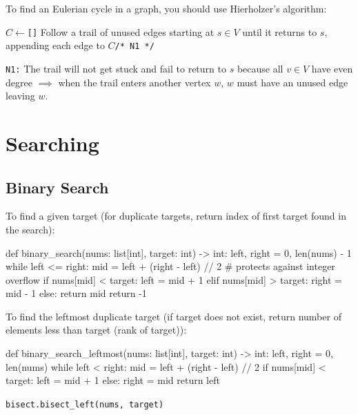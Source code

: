 \documentclass[12pt, titlepage]{article}
\begin{document}
To find an Eulerian cycle in a graph, you should use Hierholzer's algorithm: \medskip

\begin{algorithm}[H]
  \SetAlgoLined
  \DontPrintSemicolon
  $C \longleftarrow$\hspace{0.5mm}\texttt{[]}\;
  Follow a trail of unused edges starting at $s \in V$ until it returns to $s$, appending each edge to $C$\hspace{58mm}\texttt{/* N1 */}\;
  \;
  \caption{Hierholzer's Algorithm\hspace{5mm}\texttt{/* see \ref{hierholzer} for code */}}
\end{algorithm} \medskip

\texttt{N1:} The trail will not get stuck and fail to return to $s$ because all $v \in V$ have even degree $\implies$ when the trail enters another vertex $w$, $w$ must have an unused edge leaving $w$.

\section{Searching}

\subsection{Binary Search}
To find a given target (for duplicate targets, return index of first target found in the search):
\begin{python}
def binary_search(nums: list[int], target: int) -> int:
    left, right = 0, len(nums) - 1
    while left <= right:
        mid = left + (right - left) // 2  # protects against integer overflow
        if nums[mid] < target:
            left = mid + 1
        elif nums[mid] > target:
            right = mid - 1
        else:
            return mid
    return -1
\end{python}
\bigskip

To find the leftmost duplicate target (if target does not exist, return number of elements less than target (rank of target)):
\begin{python}
def binary_search_leftmost(nums: list[int], target: int) -> int:
    left, right = 0, len(nums)
    while left < right:
        mid = left + (right - left) // 2
        if nums[mid] < target:
            left = mid + 1
        else:
            right = mid
    return left
\end{python}
\texttt{bisect.bisect\_left(nums, target)} \\
\end{document}
